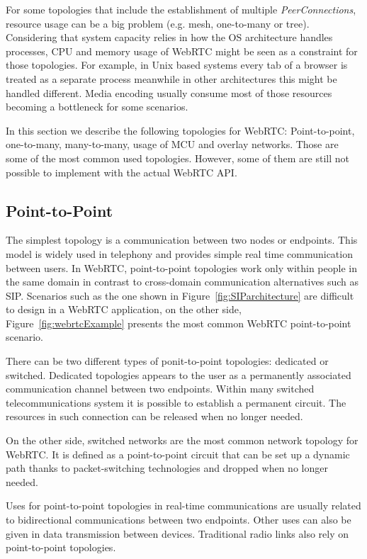 For some topologies that include the establishment of multiple {\it PeerConnections}, resource usage can be a big problem (e.g. mesh, one-to-many or tree). Considering that system capacity relies in how the OS architecture handles processes, CPU and memory usage of WebRTC might be seen as a constraint for those topologies. For example, in Unix based systems every tab of a browser is treated as a separate process meanwhile in other architectures this might be handled different. Media encoding usually consume most of those resources becoming a bottleneck for some scenarios.

In this section we describe the following topologies for WebRTC: Point-to-point, one-to-many, many-to-many, usage of MCU and overlay networks. Those are some of the most common used topologies. However, some of them are still not possible to implement with the actual WebRTC API.

\subsection{Point-to-Point}

The simplest topology is a communication between two nodes or endpoints. This model is widely used in telephony and provides simple real time communication between users. In WebRTC, point-to-point topologies work only within people in the same domain in contrast to cross-domain communication alternatives such as SIP. Scenarios such as the one shown in Figure~\ref{fig:SIParchitecture} are difficult to design in a WebRTC application, on the other side, Figure~\ref{fig:webrtcExample} presents the most common WebRTC point-to-point scenario.

There can be two different types of ponit-to-point topologies: dedicated or switched. Dedicated topologies appears to the user as a permanently associated communication channel between two endpoints. Within many switched telecommunications system it is possible to establish a permanent circuit. The resources in such connection can be released when no longer needed.

On the other side, switched networks are the most common network topology for WebRTC. It is defined as a point-to-point circuit that can be set up a dynamic path thanks to packet-switching technologies and dropped when no longer needed. 

Uses for point-to-point topologies in real-time communications are usually related to bidirectional communications between two endpoints. Other uses can also be given in data transmission between devices. Traditional radio links also rely on point-to-point topologies.
 
